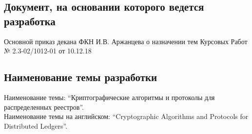 \subsection{Документ, на основании которого ведется разработка}
Основной приказ декана ФКН И.В. Аржанцева о назначении тем Курсовых Работ
\textnumero № 2.3-02/1012-01 от 10.12.18

\subsection{Наименование темы разработки}
Наименование темы: ``Криптографические алгоритмы и протоколы для распределенных реестров''. \\
Наименование темы на английском: ``Cryptographic Algorithms and Protocols for Distributed Ledgers''.
